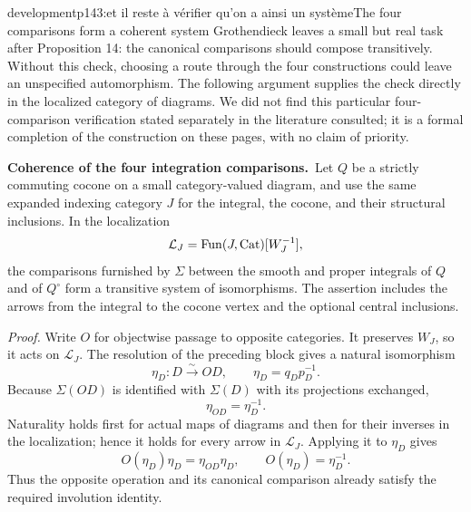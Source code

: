 \begin{dcomment}{development}{p143:et il reste à vérifier qu'on a ainsi un système}{The four comparisons form a coherent system}
Grothendieck leaves a small but real task after Proposition 14: the canonical comparisons should compose transitively. Without this check, choosing a route through the four constructions could leave an unspecified automorphism. The following argument supplies the check directly in the localized category of diagrams. We did not find this particular four-comparison verification stated separately in the literature consulted; it is a formal completion of the construction on these pages, with no claim of priority.

\textbf{Coherence of the four integration comparisons.}\ours\
Let $Q$ be a strictly commuting cocone on a small category-valued diagram, and use the same expanded indexing category $J$ for the integral, the cocone, and their structural inclusions. In the localization
\[
 \mathcal L_J=\operatorname{Fun}(J,\mathrm{Cat})[W_J^{-1}],
\]
the comparisons furnished by $\Sigma$ between the smooth and proper integrals of $Q$ and of $Q^\circ$ form a transitive system of isomorphisms. The assertion includes the arrows from the integral to the cocone vertex and the optional central inclusions.

\emph{Proof.} Write $O$ for objectwise passage to opposite categories. It preserves $W_J$, so it acts on $\mathcal L_J$. The resolution of the preceding block gives a natural isomorphism
\[
 \eta_D:D\xrightarrow{\sim}OD,
 \qquad \eta_D=q_Dp_D^{-1}.
\]
Because $\Sigma(OD)$ is identified with $\Sigma(D)$ with its projections exchanged,
\[
 \eta_{OD}=\eta_D^{-1}.
\]
Naturality holds first for actual maps of diagrams and then for their inverses in the localization; hence it holds for every arrow in $\mathcal L_J$. Applying it to $\eta_D$ gives
\[
 O(\eta_D)\eta_D=\eta_{OD}\eta_D,
 \qquad O(\eta_D)=\eta_D^{-1}.
\]
Thus the opposite operation and its canonical comparison already satisfy the required involution identity.


\end{dcomment}
